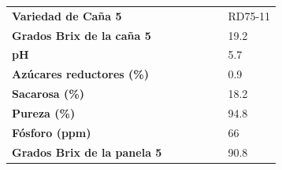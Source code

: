 \documentclass{article}%
\begin{document}
\linebreak%
\newline%
%
\linebreak%
\begin{tabular}{lcccccl}%
\textbf{Variedad de Caña 5}& & & & & &RD75{-}11\\%
\textbf{Grados Brix de la caña 5}& & & & & &19.2\\%
\textbf{pH}& & & & & &5.7\\%
\textbf{Azúcares reductores (\%)}& & & & & &0.9\\%
\textbf{Sacarosa (\%)}& & & & & &18.2\\%
\textbf{Pureza (\%)}& & & & & &94.8\\%
\textbf{Fósforo (ppm)}& & & & & &66\\%
\textbf{Grados Brix de la panela 5}& & & & & &90.8\\%
\end{tabular}%
\linebreak%
\newline%
%
\linebreak%
\end{document}
